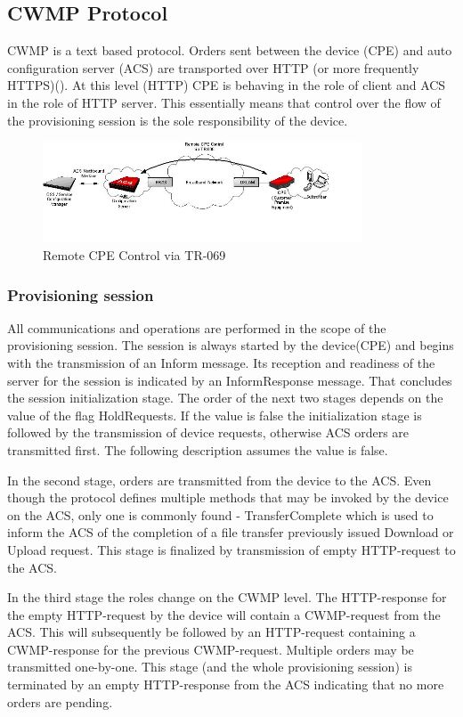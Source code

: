 \subsection{CWMP Protocol}
\label{basics}
CWMP is a text based protocol. Orders sent between the device (CPE) and auto configuration server (ACS) are transported over HTTP (or more frequently HTTPS)(). At this level (HTTP) CPE is behaving in the role of client and ACS in the role of HTTP server. This essentially means that control over the flow of the provisioning session is the sole responsibility of the device.
\begin{figure}[htbp]
	\centering
		\includegraphics[width=9.5cm]{Figures/Remote_CPE_Control_via_TR-069.jpg}
	\caption[Remote CPE Control via TR-069]{Remote CPE Control via TR-069}
	\label{fig:remotecontrol}
\end{figure}
\subsubsection{Provisioning session}
All communications and operations are performed in the scope of the provisioning session. The session is always started by the device(CPE) and begins with the transmission of an Inform message. Its reception and readiness of the server for the session is indicated by an InformResponse message. That concludes the session initialization stage. The order of the next two stages depends on the value of the flag HoldRequests. If the value is false the initialization stage is followed by the transmission of device requests, otherwise ACS orders are transmitted first. The following description assumes the value is false.

In the second stage, orders are transmitted from the device to the ACS. Even though the protocol defines multiple methods that may be invoked by the device on the ACS, only one is commonly found - TransferComplete which is used to inform the ACS of the completion of a file transfer previously issued Download or Upload request. This stage is finalized by transmission of empty HTTP-request to the ACS.

In the third stage the roles change on the CWMP level. The HTTP-response for the empty HTTP-request by the device will contain a CWMP-request from the ACS. This will subsequently be followed by an HTTP-request containing a CWMP-response for the previous CWMP-request. Multiple orders may be transmitted one-by-one. This stage (and the whole provisioning session) is terminated by an empty HTTP-response from the ACS indicating that no more orders are pending.



